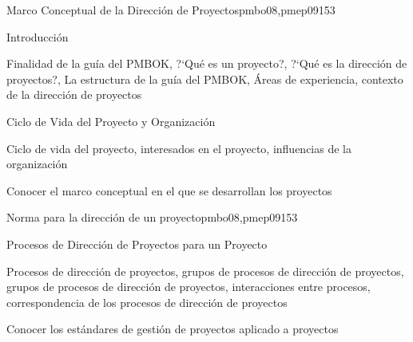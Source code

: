 \begin{syllabus}
\begin{outcomes}
\end{outcomes}

\begin{unit}{Marco Conceptual de la Dirección de Proyectos}{pmbo08,pmep09}{15}{3}
\begin{topics}
      \item Introducción
       \item Finalidad de la guía del PMBOK, ?`Qué es un proyecto?, ?`Qué es la dirección de proyectos?, La estructura de la guía del PMBOK, Áreas de experiencia, contexto de la dirección de proyectos
      \item Ciclo de Vida del Proyecto y Organización
       \item Ciclo de vida del proyecto, interesados en el proyecto, influencias de la organización
   \end{topics}

   \begin{unitgoals}
      \item Conocer el marco conceptual en el que se desarrollan los proyectos
   \end{unitgoals}
\end{unit}

\begin{unit}{Norma para la dirección de un proyecto}{pmbo08,pmep09}{15}{3}
\begin{topics}
      \item Procesos de Dirección de Proyectos para un Proyecto
       \item Procesos de dirección de proyectos, grupos de procesos de dirección de proyectos, grupos de procesos de dirección de proyectos, interacciones entre procesos, correspondencia de los procesos de dirección de proyectos
   \end{topics}

   \begin{unitgoals}
      \item Conocer los estándares de gestión de proyectos aplicado a proyectos
   \end{unitgoals}
\end{unit}


\end{syllabus}
